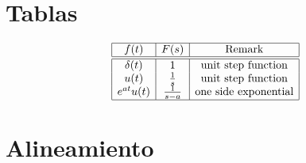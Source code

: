 \documentclass{article}
\begin{document}
\section*{Tablas}

\[
\begin{array}{|c|c|c|}
\hline
f(t) & F(s) & \mbox{Remark}\\
\hline\hline
\delta(t) & 1 & \mbox{unit step function}\\
u(t) & \frac{1}{s} & \mbox{unit step function}\\
e^{at}u(t) & \frac{1}{s-a} & \mbox{one side exponential}\\
\hline\end{array}\]

\section*{Alineamiento}
\end{document}
